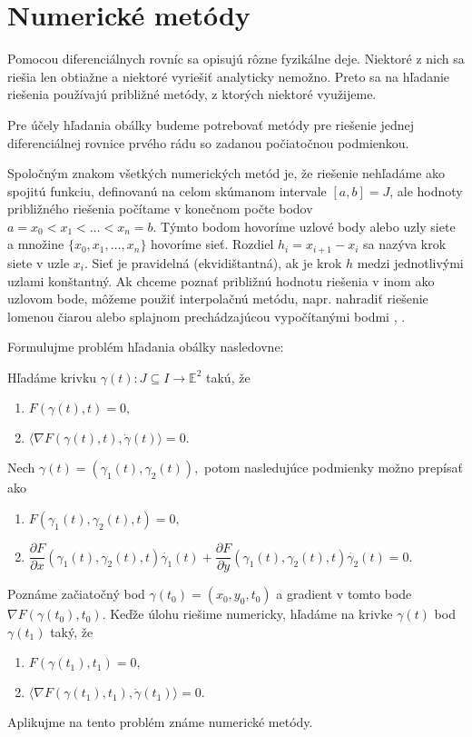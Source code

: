 \chapter{Numerické metódy}
Pomocou diferenciálnych rovníc sa opisujú rôzne fyzikálne deje. Niektoré z nich sa riešia len obtiažne a niektoré vyriešiť analyticky nemožno. Preto sa na hľadanie riešenia používajú približné metódy, z ktorých niektoré využijeme. 

Pre účely hľadania obálky budeme potrebovať metódy pre riešenie jednej diferenciálnej rovnice prvého rádu so zadanou počiatočnou podmienkou. 

Spoločným znakom všetkých numerických metód je, že riešenie nehľadáme ako spojitú funkciu, definovanú na celom skúmanom intervale $[a, b] = J$, ale  hodnoty približného riešenia počítame v konečnom počte bodov $ a = x_0 < x_1 < \dots < x_n = b.$ Týmto bodom hovoríme uzlové body alebo uzly siete a množine $\{x_0, x_1, \dots, x_n\}$ hovoríme sieť. Rozdiel $h_i = x_{i+1} - x_{i}$ sa nazýva krok siete v uzle $x_i.$ Sieť je pravidelná (ekvidištantná), ak je krok $h$ medzi jednotlivými uzlami konštantný. Ak chceme poznať približnú hodnotu riešenia v inom ako uzlovom bode, môžeme použiť interpolačnú metódu, napr. nahradiť riešenie lomenou čiarou alebo splajnom prechádzajúcou vypočítanými bodmi \cite{Bab00}, \cite{Hla}.

Formulujme problém hľadania obálky nasledovne:

Hľadáme krivku $\gamma(t) \colon J \subseteq I \rightarrow \mathbb{E}^{2} $ takú, že 
\begin{enumerate}
\item $F(\gamma(t), t) = 0, $ 
\item $\langle \nabla F(\gamma(t), t), \dot{\gamma}(t) \rangle = 0.$
\end{enumerate}
Nech $\gamma(t) = (\gamma_{1}(t), \gamma_{2}(t)), $ potom nasledujúce podmienky možno prepísať ako
\begin{enumerate}
\item $F(\gamma_{1}(t), \gamma_{2}(t), t) = 0, $ 
\item $\dfrac{\partial F}{\partial x} (\gamma_1 (t), \gamma_2 (t), t) \dot{\gamma_{1}}(t) + \dfrac{\partial F}{\partial y}(\gamma_1 (t), \gamma_2 (t), t) \dot{\gamma_{2}}(t) = 0.$
\end{enumerate}
Poznáme začiatočný bod $ \gamma (t_0) =(x_0, y_0, t_0) $ a gradient v tomto bode $ \nabla F (\gamma (t_0), t_{0})$. Keďže úlohu riešime numericky, hľadáme na krivke $\gamma(t)$ bod $\gamma(t_1)$ taký, že
\begin{enumerate}
\item $F(\gamma(t_{1}), t_{1}) = 0, $ 
\item $\langle \nabla F(\gamma(t_{1}), t_{1}), \dot{\gamma}(t_{1}) \rangle = 0.$
\end{enumerate}
Aplikujme na tento problém známe numerické metódy.

